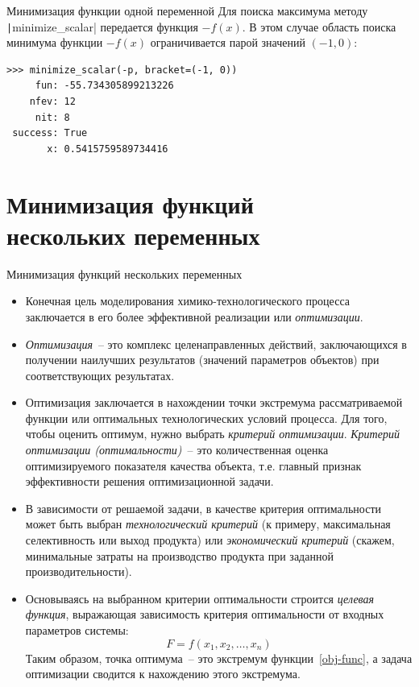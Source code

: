 \documentclass[aspectratio=169, mathserif]{beamer}	%
\begin{document}
\begin{frame}[fragile]{Минимизация функции одной переменной}
\scriptsize
Для поиска максимума методу \texttt|minimize_scalar| передается функция $-f(x)$. В этом случае область поиска минимума функции $-f(x)$ ограничивается парой значений $(-1, 0)$:
\vfill
\begin{verbatim}
>>> minimize_scalar(-p, bracket=(-1, 0))
     fun: -55.734305899213226
    nfev: 12
     nit: 8
 success: True
       x: 0.5415759589734416
\end{verbatim}
\vfill
\end{frame}

\section{Минимизация функций \\ нескольких переменных}
\sectionframe

\begin{frame}[fragile]{Минимизация функций нескольких переменных}
\scriptsize
\begin{itemize}
	\item Конечная цель моделирования химико-технологического процесса заключается в его более эффективной реализации или \textit{оптимизации}.

	\item \textit{Оптимизация}~-- это комплекс целенаправленных действий, заключающихся в получении наилучших результатов (значений параметров объектов) при соответствующих результатах.

	\item Оптимизация заключается в нахождении точки экстремума рассматриваемой функции или оптимальных технологических условий процесса. Для того, чтобы оценить оптимум, нужно выбрать \textit{критерий оптимизации}. \textit{Критерий оптимизации (оптимальности)}~-- это количественная оценка оптимизируемого показателя качества объекта, т.е. главный признак эффективности решения оптимизационной задачи.

	\item В зависимости от решаемой задачи, в качестве критерия оптимальности может быть выбран \textit{технологический критерий} (к примеру, максимальная селективность или выход продукта) или \textit{экономический критерий} (скажем, минимальные затраты на производство продукта при заданной производительности).

	\item Основываясь на выбранном критерии оптимальности строится \textit{целевая функция}, выражающая зависимость критерия оптимальности от входных параметров системы:
	\begin{equation}\label{obj-func}
		F = f(x_1, x_2, \ldots, x_n)
	\end{equation}
	Таким образом, точка оптимума~-- это экстремум функции~\eqref{obj-func}, а задача оптимизации сводится к нахождению этого экстремума.
\end{itemize}
\vfill
\end{frame}
\end{document}

